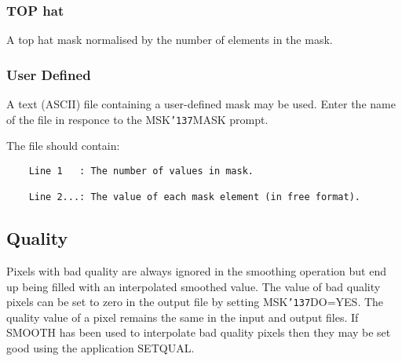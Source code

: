 \documentclass{book}
\renewcommand{\_}{{\tt\char'137}}     %
\begin{document}
\subsubsection{TOP hat}
A top hat mask normalised by the number of elements in the mask.
 
\subsubsection{User Defined}
A text (ASCII) file containing a user-defined mask may be used.
Enter the name of the file in responce to the MSK\_MASK prompt.
 
The file should contain:
\begin{verbatim}
    Line 1   : The number of values in mask.
 
    Line 2...: The value of each mask element (in free format).
\end{verbatim}
\subsection{Quality}
Pixels with bad quality are always ignored in the smoothing operation
but end up being filled with an interpolated smoothed value. The value
of bad quality pixels can be set to zero in the output file by setting
MSK\_DO=YES. The quality value of a pixel remains the same in the
input and output files. If SMOOTH has been used to interpolate bad
quality pixels then they may be set good using the application
SETQUAL.
 
\end{document}
